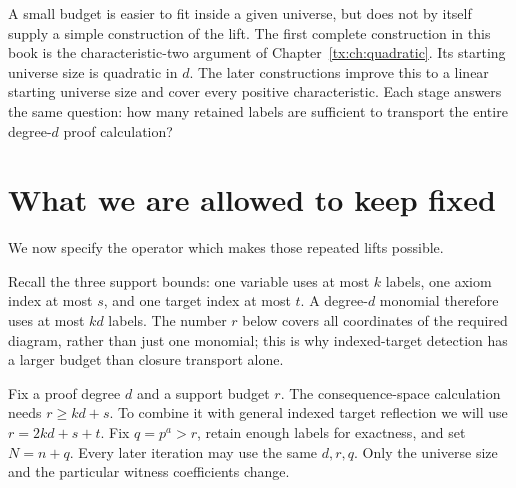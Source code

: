 \documentclass[11pt,a4paper,oneside,openany]{book}
\theoremstyle{definition}\newtheorem{definition}[theorem]{Definition}
\theoremstyle{remark}\newtheorem{remark}[theorem]{Remark}
\numberwithin{equation}{chapter}
\begin{document}
A small budget is easier to fit inside a given universe, but does not
by itself supply a simple construction of the lift. The first complete
construction in this book is the characteristic-two argument of
Chapter~\ref{tx:ch:quadratic}. Its starting universe size is quadratic in $d$.
The later constructions improve this to a linear starting universe size and
cover every positive characteristic. Each stage answers the same
question: how many retained labels are sufficient to transport the
entire degree-$d$ proof calculation?

\section{What we are allowed to keep fixed}
We now specify the operator which makes those repeated lifts possible.

Recall the three support bounds: one variable uses at most $k$ labels,
one axiom index at most $s$, and one target index at most $t$.
A degree-$d$ monomial therefore uses at most $kd$ labels. The number
$r$ below covers all coordinates of the required diagram, rather than
just one monomial; this is why indexed-target detection has a larger
budget than closure transport alone.

Fix a proof degree $d$ and a support budget $r$. The consequence-space
calculation needs $r\ge kd+s$. To combine it with general indexed target
reflection we will use $r=2kd+s+t$. Fix $q=p^a>r$, retain enough labels
for exactness, and set $N=n+q$. Every later iteration may use the same
$d,r,q$. Only the universe size and the particular witness coefficients
change.
\end{document}
